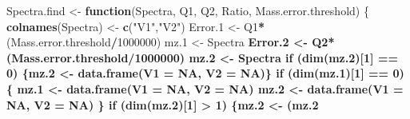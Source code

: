 \documentclass[]{article}
\newenvironment{Shaded}{\begin{snugshade}}{\end{snugshade}}
\newcommand{\KeywordTok}[1]{\textcolor[rgb]{0.13,0.29,0.53}{\textbf{#1}}}
\newcommand{\DataTypeTok}[1]{\textcolor[rgb]{0.13,0.29,0.53}{#1}}
\newcommand{\DecValTok}[1]{\textcolor[rgb]{0.00,0.00,0.81}{#1}}
\newcommand{\StringTok}[1]{\textcolor[rgb]{0.31,0.60,0.02}{#1}}
\newcommand{\OtherTok}[1]{\textcolor[rgb]{0.56,0.35,0.01}{#1}}
\newcommand{\ControlFlowTok}[1]{\textcolor[rgb]{0.13,0.29,0.53}{\textbf{#1}}}
\newcommand{\OperatorTok}[1]{\textcolor[rgb]{0.81,0.36,0.00}{\textbf{#1}}}
\newcommand{\NormalTok}[1]{#1}
\begin{document}
\begin{Shaded}
\begin{Highlighting}[]
\NormalTok{Spectra.find <-}\StringTok{ }\ControlFlowTok{function}\NormalTok{(Spectra, Q1, Q2, Ratio, Mass.error.threshold) \{}
  \KeywordTok{colnames}\NormalTok{(Spectra) <-}\StringTok{ }\KeywordTok{c}\NormalTok{(}\StringTok{"V1"}\NormalTok{,}\StringTok{"V2"}\NormalTok{)}
\NormalTok{  Error.}\DecValTok{1}\NormalTok{ <-}\StringTok{ }\NormalTok{Q1}\OperatorTok{*}\NormalTok{(Mass.error.threshold}\OperatorTok{/}\DecValTok{1000000}\NormalTok{) }
\NormalTok{  mz.}\DecValTok{1}\NormalTok{ <-}\StringTok{ }\NormalTok{Spectra }\OperatorTok{%>%}\StringTok{ }\KeywordTok{filter}\NormalTok{((V1 }\OperatorTok{>}\StringTok{ }\NormalTok{Q1}\OperatorTok{-}\NormalTok{Error.}\DecValTok{1}\NormalTok{) }\OperatorTok{&}\StringTok{ }\NormalTok{(V1 }\OperatorTok{<}\StringTok{ }\NormalTok{Q1}\OperatorTok{+}\NormalTok{Error.}\DecValTok{1}\NormalTok{))}
\NormalTok{  Error.}\DecValTok{2}\NormalTok{ <-}\StringTok{ }\NormalTok{Q2}\OperatorTok{*}\NormalTok{(Mass.error.threshold}\OperatorTok{/}\DecValTok{1000000}\NormalTok{) }
\NormalTok{  mz.}\DecValTok{2}\NormalTok{ <-}\StringTok{ }\NormalTok{Spectra }\OperatorTok{%>%}\StringTok{ }\KeywordTok{filter}\NormalTok{((V1 }\OperatorTok{>}\StringTok{ }\NormalTok{Q2}\OperatorTok{-}\NormalTok{Error.}\DecValTok{2}\NormalTok{) }\OperatorTok{&}\StringTok{ }\NormalTok{(V1 }\OperatorTok{<}\StringTok{ }\NormalTok{Q2}\OperatorTok{+}\NormalTok{Error.}\DecValTok{2}\NormalTok{))}
  \ControlFlowTok{if}\NormalTok{ (}\KeywordTok{dim}\NormalTok{(mz.}\DecValTok{2}\NormalTok{)[}\DecValTok{1}\NormalTok{] }\OperatorTok{==}\StringTok{ }\DecValTok{0}\NormalTok{) \{mz.}\DecValTok{2}\NormalTok{ <-}\StringTok{ }\KeywordTok{data.frame}\NormalTok{(}\DataTypeTok{V1 =} \OtherTok{NA}\NormalTok{, }\DataTypeTok{V2 =} \OtherTok{NA}\NormalTok{)\}}
  \ControlFlowTok{if}\NormalTok{ (}\KeywordTok{dim}\NormalTok{(mz.}\DecValTok{1}\NormalTok{)[}\DecValTok{1}\NormalTok{] }\OperatorTok{==}\StringTok{ }\DecValTok{0}\NormalTok{) \{}
\NormalTok{    mz.}\DecValTok{1}\NormalTok{ <-}\StringTok{ }\KeywordTok{data.frame}\NormalTok{(}\DataTypeTok{V1 =} \OtherTok{NA}\NormalTok{, }\DataTypeTok{V2 =} \OtherTok{NA}\NormalTok{)}
\NormalTok{    mz.}\DecValTok{2}\NormalTok{ <-}\StringTok{ }\KeywordTok{data.frame}\NormalTok{(}\DataTypeTok{V1 =} \OtherTok{NA}\NormalTok{, }\DataTypeTok{V2 =} \OtherTok{NA}\NormalTok{)}
\NormalTok{  \}}
  \ControlFlowTok{if}\NormalTok{ (}\KeywordTok{dim}\NormalTok{(mz.}\DecValTok{2}\NormalTok{)[}\DecValTok{1}\NormalTok{] }\OperatorTok{>}\StringTok{ }\DecValTok{1}\NormalTok{) \{mz.}\DecValTok{2}\NormalTok{ <-}\StringTok{ }\NormalTok{(mz.}\DecValTok{2} \OperatorTok{%>%}\StringTok{ }\KeywordTok{mutate}\NormalTok{(}\DataTypeTok{Error =} \KeywordTok{abs}\NormalTok{(V1}\OperatorTok{-}\NormalTok{Q2)) }\OperatorTok{%>%}\StringTok{ }\KeywordTok{filter}\NormalTok{(Error }\OperatorTok{==}\StringTok{ }\KeywordTok{min}\NormalTok{(Error)))[,}\KeywordTok{c}\NormalTok{(}\DecValTok{1}\OperatorTok{:}\DecValTok{2}\NormalTok{)]\}}
}}}
\end{Highlighting}
\end{Shaded}
\end{document}
